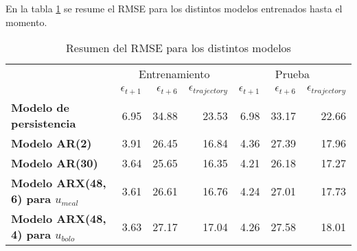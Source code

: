 En la tabla \ref{table:Resultados RMSE} se resume el RMSE para los distintos modelos entrenados hasta el momento.



\begin{table}[H]
	\centering
	\begin{tabular}{lrrr|rrr}
		\hline \hline
		& \multicolumn{3}{c|}{Entrenamiento} & \multicolumn{3}{c}{Prueba} \\
		& $\epsilon_{t+1}$ & $\epsilon_{t+6}$ &$\epsilon_{trajectory}$ & $\epsilon_{t+1}$  & $\epsilon_{t+6}$ & $\epsilon_{trajectory}$ \\ \hline
		\textbf{Modelo de persistencia}   				& 6.95 & 34.88 & 23.53 & 6.98 & 33.17 & 22.66 \\
		\textbf{Modelo AR(2)}   						& 3.91 & 26.45 & 16.84 & 4.36 & 27.39 & 17.96 \\
		\textbf{Modelo AR(30)} 	   						& 3.64 & 25.65 & 16.35 & 4.21 & 26.18 & 17.27 \\
		\textbf{Modelo ARX(48, 6) para $u_{meal}$}   	& 3.61 & 26.61 & 16.76 & 4.24 & 27.01 & 17.73 \\
		\textbf{Modelo ARX(48, 4) para $u_{bolo}$}   	& 3.63 & 27.17 & 17.04 & 4.26 & 27.58 & 18.01 \\
		\hline \hline
	\end{tabular}
	\caption{Resumen del RMSE para los distintos modelos}
	\label{table:Resultados RMSE}
\end{table}







